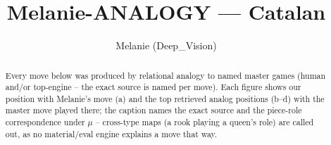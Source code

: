 \documentclass[11pt]{article}
\title{Melanie-ANALOGY — Catalan}
\author{Melanie (Deep\_Vision)}
\date{}
\begin{document}
\maketitle

\begin{abstract}Every move below was produced by relational analogy to named master games (human and/or top-engine -- the exact source is named per move). Each figure shows our position with Melanie's move (a) and the top retrieved analog positions (b--d) with the master move played there; the caption names the exact source and the piece-role correspondence under $\mu$ -- cross-type maps (a rook playing a queen's role) are called out, as no material/eval engine explains a move that way.\end{abstract}

\begin{figure}[p]\centering
\begin{subfigure}{0.46\textwidth}\centering
\resizebox{\linewidth}{!}{%
\newchessgame
\chessboard[
  setfen={rnbq1rk1/ppp1bppp/4pn2/4N3/2pP4/6P1/PP2PPBP/RNBQ1RK1 b - - 1 7},
  showmover=false,
  pgfstyle=straightmove, color=movearrow, markmove={f6-d5}
]}
\caption{}
\end{subfigure}\hfill
\begin{subfigure}{0.46\textwidth}\centering
\resizebox{\linewidth}{!}{%
\newchessgame
\chessboard[
  setfen={rnbq1rk1/pp2bppp/2p1pn2/4N3/2pP1B2/6P1/PP2PPBP/RN1Q1RK1 b - - 1 9},
  showmover=false,
  pgfstyle=straightmove, color=movearrow, markmove={f6-d5}
]}
\caption{}
\end{subfigure}
\\[4pt]
\begin{subfigure}{0.46\textwidth}\centering
\resizebox{\linewidth}{!}{%
\newchessgame
\chessboard[
  setfen={rnbq1rk1/pp2bppp/2p1pn2/4N3/2pP1B2/6P1/PP2PPBP/RN1Q1RK1 b - - 1 9},
  showmover=false,
  pgfstyle=straightmove, color=movearrow, markmove={f6-d5}
]}
\caption{}
\end{subfigure}\hfill
\begin{subfigure}{0.46\textwidth}\centering
\resizebox{\linewidth}{!}{%
\newchessgame
\chessboard[
  setfen={rnbq1rk1/pp2bppp/2p1pn2/4N3/2pP1B2/6P1/PP2PPBP/RN1Q1RK1 b - - 1 9},
  showmover=false,
  pgfstyle=straightmove, color=movearrow, markmove={f6-d5}
]}
\caption{}
\end{subfigure}

\end{figure}
\end{document}
